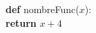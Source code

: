 \documentclass[preview]{standalone}
\begin{document}
\begin{center}
\textbf{def} nombreFunc($x$): \\ \hspace{1.5em} \textbf{return} $x + 4$
\end{center}
\end{document}
